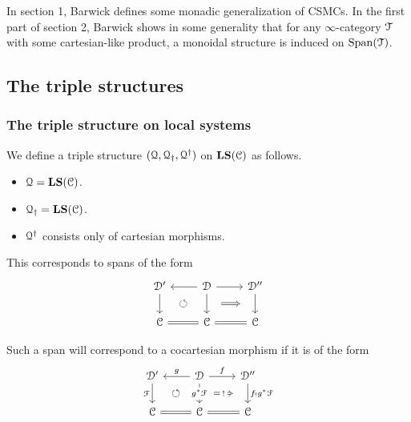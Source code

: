 \documentclass[main.tex]{subfiles}
\begin{document}
In section 1, Barwick defines some monadic generalization of CSMCs. In the first part of section 2, Barwick shows in some generality that for any $\infty$-category $\mathcal{T}$ with some cartesian-like product, a monoidal structure is induced on $\mathrm{Span}(\mathcal{T})$.

\subsection{The triple structures}
\label{ssc:the_triple_structures_bare}

\subsubsection{The triple structure on local systems}
\label{sss:the_triple_structure_on_local_systems}


We define a triple structure $(\mathcal{Q}, \mathcal{Q}_{\dagger}, \mathcal{Q}^{\dagger})$ on $\mathbf{LS}(\mathcal{C})$ as follows.
\begin{itemize}
  \item $\mathcal{Q} = \mathbf{LS}(\mathcal{C})$.

  \item $\mathcal{Q}_{\dagger} = \mathbf{LS}(\mathcal{C})$.

  \item $\mathcal{Q}^{\dagger}$ consists only of cartesian morphisms.
\end{itemize}

This corresponds to spans of the form
\begin{equation*}
  \begin{tikzcd}
    \category{D}'
    \arrow[d, ""{name=L, right}]
    & \category{D}
    \arrow[d, ""{name=ML, left}, ""{name=MR, right}]
    \arrow[l, swap]
    \arrow[r]
    & \category{D}''
    \arrow[d, ""{name=R, left}]
    \\
    \category{C}
    \arrow[r, equals]
    &\category{C}
    & \category{C}
    \arrow[l, equals]
    \arrow[Rightarrow, from=MR, to=R, shorten=2ex]
    \arrow[Rightarrow, from=ML, to=L, phantom, "\circlearrowleft"{description}]
  \end{tikzcd}
\end{equation*}

Such a span will correspond to a cocartesian morphism if it is of the form
\begin{equation*}
  \begin{tikzcd}
    \category{D}'
    \arrow[d, "\mathcal{F}"{left}, ""{name=L, right}]
    & \category{D}
    \arrow[d, "g^{*}\mathcal{F}"{description}, ""{name=ML, left}, ""{name=MR, right}]
    \arrow[l, swap, "g"]
    \arrow[r, "f"]
    & \category{D}''
    \arrow[d, ""{name=R, left}, "f_{!}g^{*}\mathcal{F}"{right}]
    \\
    \category{C}
    \arrow[r, equals]
    &\category{C}
    & \category{C}
    \arrow[l, equals]
    \arrow[Rightarrow, from=MR, to=R, shorten=2ex, "!"{description}]
    \arrow[from=ML, to=L, phantom, "\circlearrowleft"{description}]
  \end{tikzcd}
\end{equation*}
\end{document}
